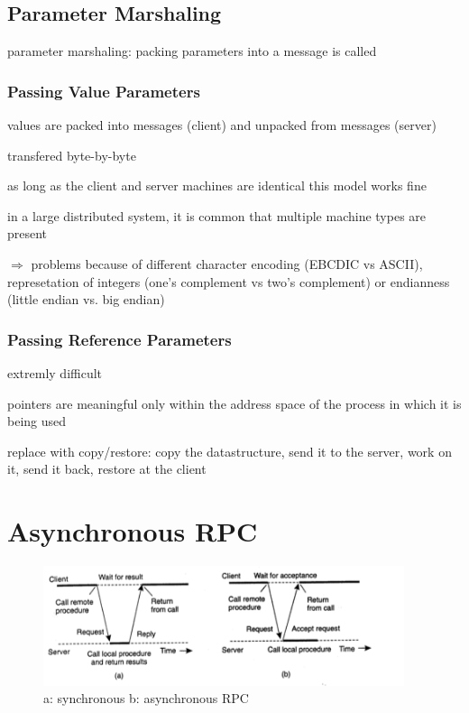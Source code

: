 \documentclass[ngerman,a4paper]{report}
\begin{document}
\subsection*{Parameter Marshaling}

parameter marshaling: packing parameters into a message is called


\subsubsection*{Passing Value Parameters}

\begin{compactitem}
	\item values are packed into messages (client) and unpacked from messages (server)
	\item transfered byte-by-byte
	\item as long as the client and server machines are identical this model works fine
	\item in a large distributed system, it is common that multiple machine types are present
	\item $\Rightarrow$ problems because of different character encoding (EBCDIC vs ASCII), represetation of integers (one's complement vs two's complement) or endianness (little endian vs. big endian)
\end{compactitem}

\subsubsection*{Passing Reference Parameters}
\begin{compactitem}
	\item extremly difficult
	\item pointers are meaningful only within the address space of the process in which it is being used
	\item replace with copy/restore: copy the datastructure, send it to the server, work on it, send it back, restore at the client
\end{compactitem}



\section{Asynchronous RPC}

\begin{figure}[h]
	\centering
	\includegraphics[width=400px]{gfx/rpc.png}
	\caption{a: synchronous b: asynchronous RPC}
	\label{img:rpc}
\end{figure}
\end{document}
